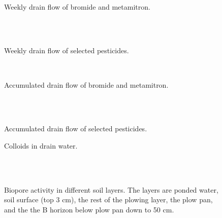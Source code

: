 \begin{figure}[htbp]
  \begin{center}
    \\
  \end{center}
  \caption{Weekly drain flow of bromide and metamitron.}
  \label{fig:Silstrup-weekly}
\end{figure}\FloatBarrier

\begin{figure}[htbp]
  \begin{center}
    \\
    \\
  \end{center}
  \caption{Weekly drain flow of selected pesticides.}
  \label{fig:Silstrup-weekly2}
\end{figure}\FloatBarrier

\begin{figure}[htbp]
  \begin{center}
    \\
  \end{center}
  \caption{Accumulated drain flow of bromide and metamitron.}
  \label{fig:Silstrup-bromide-acc}
\end{figure}\FloatBarrier

\begin{figure}[htbp]
  \begin{center}
    \\
    \\
  \end{center}
  \caption{Accumulated drain flow of selected pesticides.}
  \label{fig:Silstrup-acc}
\end{figure}\FloatBarrier

\begin{figure}[htbp]
  \begin{center}
  \end{center}
  \caption{Colloids in drain water.}
  \label{fig:Silstrup-colloids}
\end{figure}\FloatBarrier

\begin{figure}[htbp]
  \begin{center}
    \\
    \\
  \end{center}
  \caption{Biopore activity in different soil layers.  The layers are
    ponded water, soil surface (top 3 cm), the rest of the plowing layer,
    the plow pan, and the the B horizon below plow pan down to 50 cm.}
  \label{fig:Silstrup-biopore}
\end{figure}\FloatBarrier

